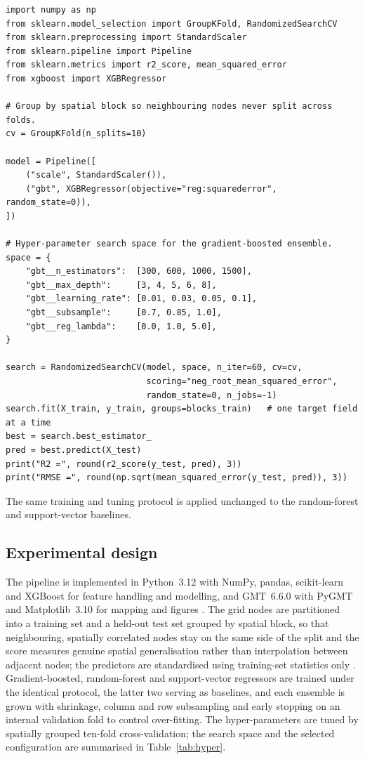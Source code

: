 \documentclass[pdflatex,sn-mathphys-num]{sn-jnl}%
\theoremstyle{thmstyleone}%
\theoremstyle{thmstyletwo}%
\theoremstyle{thmstylethree}%
\begin{document}
\begin{lstlisting}[style=py,caption={Model training and spatially grouped cross-validation routine with randomised hyper-parameter search.},label={lst:train}]
import numpy as np
from sklearn.model_selection import GroupKFold, RandomizedSearchCV
from sklearn.preprocessing import StandardScaler
from sklearn.pipeline import Pipeline
from sklearn.metrics import r2_score, mean_squared_error
from xgboost import XGBRegressor

# Group by spatial block so neighbouring nodes never split across folds.
cv = GroupKFold(n_splits=10)

model = Pipeline([
    ("scale", StandardScaler()),
    ("gbt", XGBRegressor(objective="reg:squarederror", random_state=0)),
])

# Hyper-parameter search space for the gradient-boosted ensemble.
space = {
    "gbt__n_estimators":  [300, 600, 1000, 1500],
    "gbt__max_depth":     [3, 4, 5, 6, 8],
    "gbt__learning_rate": [0.01, 0.03, 0.05, 0.1],
    "gbt__subsample":     [0.7, 0.85, 1.0],
    "gbt__reg_lambda":    [0.0, 1.0, 5.0],
}

search = RandomizedSearchCV(model, space, n_iter=60, cv=cv,
                            scoring="neg_root_mean_squared_error",
                            random_state=0, n_jobs=-1)
search.fit(X_train, y_train, groups=blocks_train)   # one target field at a time
best = search.best_estimator_
pred = best.predict(X_test)
print("R2 =", round(r2_score(y_test, pred), 3))
print("RMSE =", round(np.sqrt(mean_squared_error(y_test, pred)), 3))
\end{lstlisting}

The same training and tuning protocol is applied unchanged to the random-forest and
support-vector baselines.

\subsection{Experimental design}\label{sec:exp}
The pipeline is implemented in Python~3.12 with NumPy, pandas, scikit-learn and XGBoost
for feature handling and modelling, and GMT~6.6.0 with PyGMT and Matplotlib~3.10 for
mapping and figures \cite{Harris2020,Pedregosa2011,Wessel2019,Uieda2020,McKinney2010,Waskom2021,Virtanen2020}. The grid
nodes are partitioned into a training set and a held-out test set grouped by spatial
block, so that neighbouring, spatially correlated nodes stay on the same side of the
split and the score measures genuine spatial generalisation rather than interpolation
between adjacent nodes; the predictors are standardised using training-set statistics
only \cite{Pedregosa2011,ChenGuestrin2016,Lemenkova202502,Harris2020,Virtanen2020}. Gradient-boosted, random-forest and
support-vector regressors are trained under the identical protocol, the latter two
serving as baselines, and each ensemble is grown with shrinkage, column and row
subsampling and early stopping on an internal validation fold to control over-fitting.
The hyper-parameters are tuned by spatially grouped ten-fold cross-validation; the
search space and the selected configuration are summarised in Table~\ref{tab:hyper}.
\end{document}
